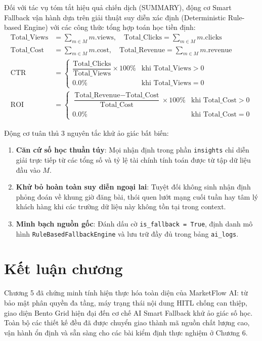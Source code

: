 Đối với tác vụ tóm tắt hiệu quả chiến dịch (SUMMARY), động cơ Smart Fallback vận hành dựa trên giải thuật suy diễn xác định (Deterministic Rule-based Engine) với các công thức tổng hợp toán học tiền định:
\begin{align}
\text{Total\_Views} &= \sum_{m \in M} m.\text{views}, \quad \text{Total\_Clicks} = \sum_{m \in M} m.\text{clicks} \\
\text{Total\_Cost} &= \sum_{m \in M} m.\text{cost}, \quad \text{Total\_Revenue} = \sum_{m \in M} m.\text{revenue} \\
\text{CTR} &= \begin{cases} \dfrac{\text{Total\_Clicks}}{\text{Total\_Views}} \times 100\% & \text{khi } \text{Total\_Views} > 0 \\ 0.0\% & \text{khi } \text{Total\_Views} = 0 \end{cases} \\
\text{ROI} &= \begin{cases} \dfrac{\text{Total\_Revenue} - \text{Total\_Cost}}{\text{Total\_Cost}} \times 100\% & \text{khi } \text{Total\_Cost} > 0 \\ 0.0\% & \text{khi } \text{Total\_Cost} = 0 \end{cases}
\end{align}

Động cơ tuân thủ 3 nguyên tắc khử ảo giác bất biến:
\begin{enumerate}
  \item \textbf{Căn cứ số học thuần túy}: Mọi nhận định trong phần \texttt{insights} chỉ diễn giải trực tiếp từ các tổng số và tỷ lệ tài chính tính toán được từ tập dữ liệu đầu vào $M$.
  \item \textbf{Khử bỏ hoàn toàn suy diễn ngoại lai}: Tuyệt đối không sinh nhận định phỏng đoán về khung giờ đăng bài, thói quen lướt mạng cuối tuần hay tâm lý khách hàng khi các trường dữ liệu này không tồn tại trong context.
  \item \textbf{Minh bạch nguồn gốc}: Đánh dấu cờ \texttt{is\_fallback = True}, định danh mô hình \texttt{RuleBasedFallbackEngine} và lưu trữ đầy đủ trong bảng \texttt{ai\_logs}.
\end{enumerate}

\section{Kết luận chương}

Chương 5 đã chứng minh tính hiện thực hóa toàn diện của MarketFlow AI: từ bảo mật phân quyền đa tầng, máy trạng thái nội dung HITL chống can thiệp, giao diện Bento Grid hiện đại đến cơ chế AI Smart Fallback khử ảo giác số học. Toàn bộ các thiết kế đều đã được chuyển giao thành mã nguồn chất lượng cao, vận hành ổn định và sẵn sàng cho các bài kiểm định thực nghiệm ở Chương 6.
